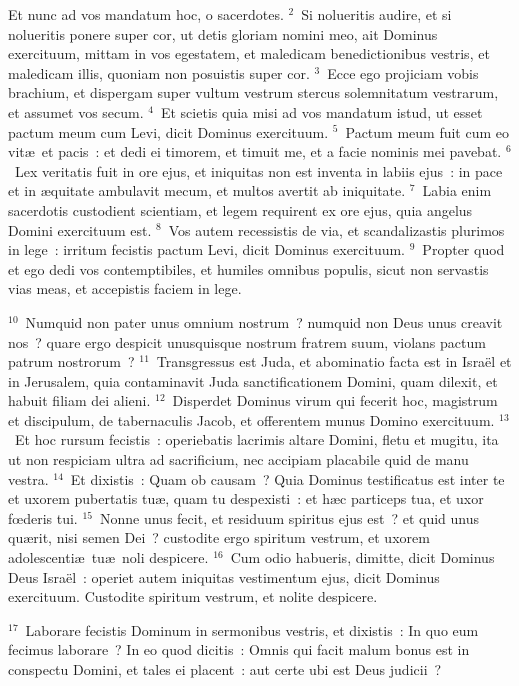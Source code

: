 \lettrine[lines=10,image=true,loversize=0.05,lraise=-0.03]{E}{}t nunc ad vos mandatum hoc, o sacerdotes.
${}^{2}$~Si nolueritis audire, et si nolueritis ponere super cor, ut detis gloriam nomini meo, ait Dominus exercituum, mittam in vos egestatem, et maledicam benedictionibus vestris, et maledicam illis, quoniam non posuistis super cor.
${}^{3}$~Ecce ego projiciam vobis brachium, et dispergam super vultum vestrum stercus solemnitatum vestrarum, et assumet vos secum.
${}^{4}$~Et scietis quia misi ad vos mandatum istud, ut esset pactum meum cum Levi, dicit Dominus exercituum.
${}^{5}$~Pactum meum fuit cum eo vit\ae\ et pacis~: et dedi ei timorem, et timuit me, et a facie nominis mei pavebat.
${}^{6}$~Lex veritatis fuit in ore ejus, et iniquitas non est inventa in labiis ejus~: in pace et in \ae quitate ambulavit mecum, et multos avertit ab iniquitate.
${}^{7}$~Labia enim sacerdotis custodient scientiam, et legem requirent ex ore ejus, quia angelus Domini exercituum est.
${}^{8}$~Vos autem recessistis de via, et scandalizastis plurimos in lege~: irritum fecistis pactum Levi, dicit Dominus exercituum.
${}^{9}$~Propter quod et ego dedi vos contemptibiles, et humiles omnibus populis, sicut non servastis vias meas, et accepistis faciem in lege.


${}^{10}$~Numquid non pater unus omnium nostrum~? numquid non Deus unus creavit nos~? quare ergo despicit unusquisque nostrum fratrem suum, violans pactum patrum nostrorum~?
${}^{11}$~Transgressus est Juda, et abominatio facta est in Isra\"el et in Jerusalem, quia contaminavit Juda sanctificationem Domini, quam dilexit, et habuit filiam dei alieni.
${}^{12}$~Disperdet Dominus virum qui fecerit hoc, magistrum et discipulum, de tabernaculis Jacob, et offerentem munus Domino exercituum.
${}^{13}$~Et hoc rursum fecistis~: operiebatis lacrimis altare Domini, fletu et mugitu, ita ut non respiciam ultra ad sacrificium, nec accipiam placabile quid de manu vestra.
${}^{14}$~Et dixistis~: Quam ob causam~? Quia Dominus testificatus est inter te et uxorem pubertatis tu\ae , quam tu despexisti~: et h\ae c particeps tua, et uxor fœderis tui.
${}^{15}$~Nonne unus fecit, et residuum spiritus ejus est~? et quid unus qu\ae rit, nisi semen Dei~? custodite ergo spiritum vestrum, et uxorem adolescenti\ae\ tu\ae\ noli despicere.
${}^{16}$~Cum odio habueris, dimitte, dicit Dominus Deus Isra\"el~: operiet autem iniquitas vestimentum ejus, dicit Dominus exercituum. Custodite spiritum vestrum, et nolite despicere.


${}^{17}$~Laborare fecistis Dominum in sermonibus vestris, et dixistis~: In quo eum fecimus laborare~? In eo quod dicitis~: Omnis qui facit malum bonus est in conspectu Domini, et tales ei placent~: aut certe ubi est Deus judicii~?

